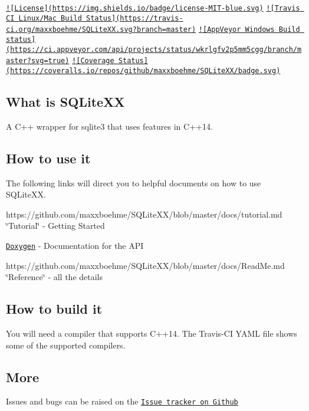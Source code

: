 \href{https://github.com/maxxboehme/SQLiteXX/blob/master/LICENSE.txt}{\tt !\mbox{[}License\mbox{]}(https\-://img.\-shields.\-io/badge/license-\/\-M\-I\-T-\/blue.\-svg)} \href{https://travis-ci.org/maxxboehme/SQLiteXX}{\tt !\mbox{[}Travis C\-I Linux/\-Mac Build Status\mbox{]}(https\-://travis-\/ci.\-org/maxxboehme/\-S\-Q\-Lite\-X\-X.\-svg?branch=master)} \href{https://ci.appveyor.com/project/maxxboehme/sqlitexx/branch/master}{\tt !\mbox{[}App\-Veyor Windows Build status\mbox{]}(https\-://ci.\-appveyor.\-com/api/projects/status/wkrlgfv2p5mm5cgg/branch/master?svg=true)} \href{https://coveralls.io/github/maxxboehme/SQLiteXX}{\tt !\mbox{[}Coverage Status\mbox{]}(https\-://coveralls.\-io/repos/github/maxxboehme/\-S\-Q\-Lite\-X\-X/badge.\-svg)}

\subsection*{What is S\-Q\-Lite\-X\-X}

A C++ wrapper for sqlite3 that uses features in C++14.

\subsection*{How to use it}

The following links will direct you to helpful documents on how to use S\-Q\-Lite\-X\-X.


\begin{DoxyItemize}
\item https\-://github.com/maxxboehme/\-S\-Q\-Lite\-X\-X/blob/master/docs/tutorial.\-md \char`\"{}\-Tutorial\char`\"{} -\/ Getting Started
\item \href{https://maxxboehme.github.io/SQLiteXX/doxygen/html}{\tt Doxygen} -\/ Documentation for the A\-P\-I
\item https\-://github.com/maxxboehme/\-S\-Q\-Lite\-X\-X/blob/master/docs/\-Read\-Me.\-md \char`\"{}\-Reference\char`\"{} -\/ all the details
\end{DoxyItemize}

\subsection*{How to build it}

You will need a compiler that supports C++14. The Travis-\/\-C\-I Y\-A\-M\-L file shows some of the supported compilers.

\subsection*{More}


\begin{DoxyItemize}
\item Issues and bugs can be raised on the \href{https://github.com/maxxboehme/SQLiteXX/issues}{\tt Issue tracker on Github} 
\end{DoxyItemize}